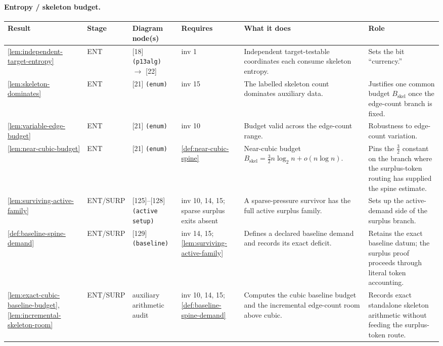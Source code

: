 \documentclass[11pt]{article}
\begin{document}
\paragraph{Entropy / skeleton budget.}
{\scriptsize\setlength{\tabcolsep}{3pt}
\begin{longtable}{L{0.10\textwidth} C{0.045\textwidth} L{0.13\textwidth} L{0.135\textwidth} L{0.28\textwidth} L{0.20\textwidth}}
\toprule
\textbf{Result} & \textbf{Stage} & \textbf{Diagram node(s)} & \textbf{Requires} & \textbf{What it does} & \textbf{Role} \\
\midrule
\endhead
\cref{lem:independent-target-entropy} & ENT & [18] \texttt{(p13alg)} $\to$ [22] & inv 1 & Independent target-testable coordinates each consume skeleton entropy. & Sets the bit ``currency.'' \\
\cref{lem:skeleton-dominates} & ENT & [21] \texttt{(enum)} & inv 15 & The labelled skeleton count dominates auxiliary data. & Justifies one common budget $B_{\mathrm{skel}}$ once the edge-count branch is fixed. \\
\cref{lem:variable-edge-budget} & ENT & [21] \texttt{(enum)} & inv 10 & Budget valid across the edge-count range. & Robustness to edge-count variation. \\
\cref{lem:near-cubic-budget} & ENT & [21] \texttt{(enum)} & \cref{def:near-cubic-spine} & Near-cubic budget $B_{\mathrm{skel}}=\tfrac32 n\log_2 n+o(n\log n)$. & Pins the $\tfrac32$ constant on the branch where the surplus-token routing has supplied the spine estimate. \\
\cref{lem:surviving-active-family} & ENT\slash SURP & [125]--[128] \texttt{(active setup)} & inv 10, 14, 15; sparse surplus exits absent & A sparse-pressure survivor has the full active surplus family. & Sets up the active-demand side of the surplus branch. \\
\cref{def:baseline-spine-demand} & ENT\slash SURP & [129] \texttt{(baseline)} & inv 14, 15; \cref{lem:surviving-active-family} & Defines a declared baseline demand and records its exact deficit. & Retains the exact baseline datum; the surplus proof proceeds through literal token accounting. \\
\cref{lem:exact-cubic-baseline-budget}, \cref{lem:incremental-skeleton-room} & ENT\slash SURP & auxiliary arithmetic audit & inv 10, 14, 15; \cref{def:baseline-spine-demand} & Computes the cubic baseline budget and the incremental edge-count room above cubic. & Records exact standalone skeleton arithmetic without feeding the surplus-token route. \\

\end{longtable}}
\end{document}

